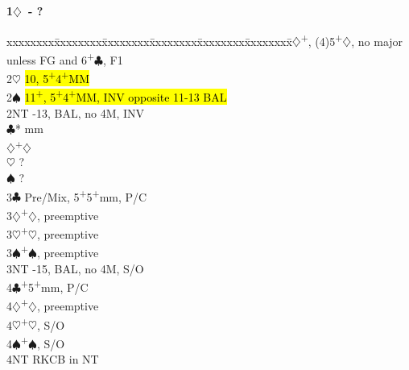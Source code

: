 \documentclass[10pt]{article}
\renewcommand{\c}{$\clubsuit$}
\renewcommand{\d}{$\diamondsuit$}
\newcommand{\h}{$\heartsuit$}
\newcommand{\s}{$\spadesuit$}
\newcommand{\p}{\textsuperscript{+}}
\newcommand{\m}{\textsuperscript{\textminus}}
\newcommand{\x}{DBL}
\newenvironment{bidtable}[1][]
{\textbf{#1}
  \begin{adjustwidth}{1em}{}
    \addvspace{2pt}
    \begin{tabbing}
      xxxxxxxx\=xxxxxxxx\=xxxxxxxx\=xxxxxxxx\=xxxxxxxx\=xxxxxxxx\=\kill}
{\end{tabbing}\end{adjustwidth}\bigskip}%
\begin{document}
\begin{multicols*}{2}
\begin{bidtable}[1\d\ - ?]
2\d       {}\p, (4)5\p\d, no major unless FG and 6\p\c, F1 \\
2\h       \> \hl{10\m, 5\p4\p MM}                             \\
2\s       \> \hl{11\p, 5\p4\p MM, INV opposite 11-13 BAL}     \\
2NT       -13, BAL, no 4M, INV                           \\
          \c*       {} mm                              \\
          \d        {}\p\d                              \\
          \h        \> ?                                  \\
          \s        \> ?                                  \\
3\c       \> Pre/Mix, 5\p 5\p mm, P/C                         \\
3\d       {}\p\d, preemptive                                \\
3\h       {}\p\h, preemptive                                \\
3\s       {}\p\s, preemptive                                \\
3NT       -15, BAL, no 4M, S/O                           \\
4\c       {}\p 5\p mm, P/C                                  \\
4\d       {}\p\d, preemptive                                \\
4\h       {}\p\h, S/O                                       \\
4\s       {}\p\s, S/O                                       \\
4NT       \> RKCB in NT
\end{bidtable}


\end{multicols*}
\end{document}
